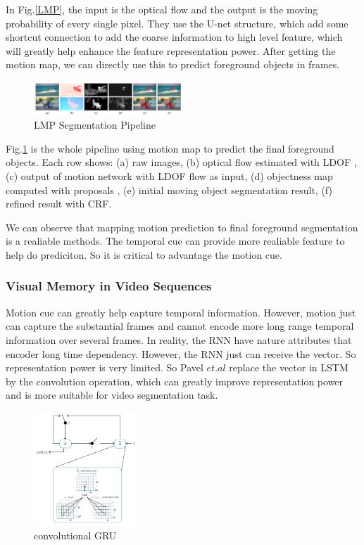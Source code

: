 In Fig.\ref{LMP}, the input is the optical flow and the output is the moving probability of every single pixel. They use the U-net structure, which
add some shortcut connection to add the coarse information to high level feature, which will greatly help enhance the feature representation power.
After getting the motion map, we can directly use this to predict foreground objects in frames. 

\begin{figure}[ht]
    \centering
    \includegraphics[width=0.5\textwidth]{./figure/LMP_results.png}
    \caption{LMP Segmentation Pipeline}
    \label{LMP_results}
\end{figure}

Fig.\ref{LMP_results} is the whole pipeline using motion map to predict the final foreground objects. Each row shows: (a) raw images,
(b) optical flow estimated with LDOF \cite{brox2009large}, (c) output of motion network with LDOF flow as input, (d) objectness map computed with
proposals \cite{pinheiro2016learning}, (e) initial moving object segmentation result, (f) refined result with CRF.

We can observe that mapping motion prediction to final foreground segmentation is a realiable methods. The temporal cue can provide more realiable
feature to help do prediciton. So it is critical to advantage the motion cue.


\subsubsection{Visual Memory in Video Sequences}
Motion cue can greatly help capture temporal information. However, motion just can capture the substantial frames and cannot encode more long range
temporal information over several frames. In reality, the RNN have nature attributes that encoder long time dependency. However, the RNN just can 
receive the vector. So representation power is very limited. So Pavel $et.al$\cite{Tokmakov2017Learning} replace the vector in LSTM by the convolution 
operation, which can greatly improve representation power and is more suitable for video segmentation task.
\begin{figure}[ht]
    \centering
    \includegraphics[width=0.35\textwidth]{figure/LVO_CONVRRU.png}
    \caption{convolutional GRU}
    \label{CONVGRU}
\end{figure}

